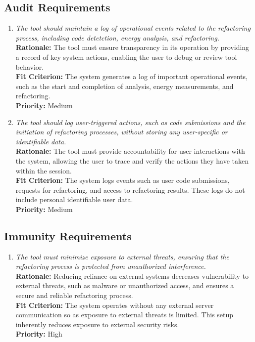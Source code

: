 \documentclass[12pt]{article}
\begin{document}
\subsection{Audit Requirements}
\begin{enumerate}[label=SR-AUR \arabic*., wide=0pt, leftmargin=*]
  \item \emph{The tool should maintain a log of operational events
      related to the refactoring process, including code detetction,
    energy analysis, and refactoring.}\\[2mm]
    {\bf Rationale:} The tool must ensure transparency in its
    operation by providing a record of key system actions, enabling
    the user to debug or review tool behavior.\\
    {\bf Fit Criterion:} The system generates a log of important
    operational events, such as the start and completion of analysis,
    energy measurements, and refactoring. \\[2mm]
    {\bf Priority:} Medium
  \item \emph{The tool should log user-triggered actions, such as
      code submissions and the initiation of refactoring processes,
    without storing any user-specific or identifiable data. }\\
    {\bf Rationale:} The tool must provide accountability for user
    interactions with the system, allowing the user to trace and
    verify the actions they have taken within the session.\\
    {\bf Fit Criterion:}  The system logs events such as user code
    submissions, requests for refactoring, and access to refactoring
    results. These logs do not include personal identifiable user data.\\
    {\bf Priority:} Medium
\end{enumerate}
\subsection{Immunity Requirements}
\begin{enumerate}[label=SR-AUR \arabic*., wide=0pt, leftmargin=*]
  \item \emph{The tool must minimize exposure to external threats,
      ensuring that the refactoring process is protected from
    unauthorized interference.}\\[2mm]
    {\bf Rationale:} Reducing reliance on external systems decreases
    vulnerability to external threats, such as malware or
    unauthorized access, and ensures a secure and reliable
    refactoring process.\\
    {\bf Fit Criterion:} The system operates without any external
    server communication so as exposure to external threats is
    limited. This setup inherently reduces exposure to external
    security risks.\\
    {\bf Priority:} High
\end{enumerate}
\end{document}
